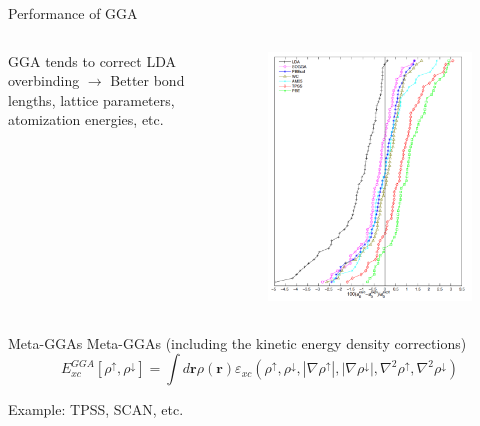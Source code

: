 \documentclass[aspectratio=169]{beamer}
\let \vec \mathbf
\begin{document}
    \begin{frame}{Performance of GGA}
        \begin{columns}
            GGA tends to correct LDA overbinding $\rightarrow$
            Better bond lengths, lattice parameters, atomization energies, etc.

            \begin{figure}
                \centering
                \includegraphics[width=\linewidth]{lectures/figures/5_bond_lengths.png}
            \end{figure}

        \end{columns}
    \end{frame}

    \begin{frame}{Meta-GGAs}
        Meta-GGAs (including the kinetic energy density corrections)
        \begin{equation*}
            E_{xc}^{GGA}[\rho^\uparrow, \rho^\downarrow] = \int d \vec{r} \rho(\vec{r})\varepsilon_{xc}(\rho^\uparrow, \rho^\downarrow, |\nabla\rho^\uparrow|, |\nabla\rho^\downarrow|, \nabla^2\rho^\uparrow, \nabla^2\rho^\downarrow)
        \end{equation*}

        Example: TPSS,\cite{taoClimbingDensityFunctional2003} SCAN,\cite{sunStronglyConstrainedAppropriately2015} etc.

    \end{frame}
\end{document}
